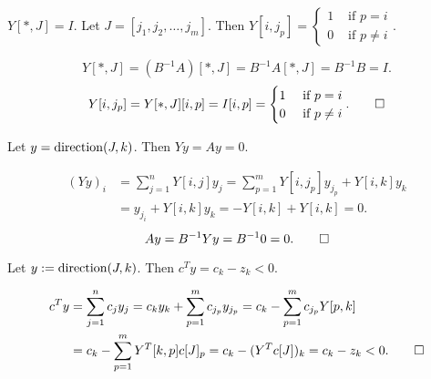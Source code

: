 \begin{lemma}
\label{thm:YJ-is-I}
$Y[*, J] = I$.
Let $J = [j_1, j_2, \ldots, j_m]$.
Then $Y[i, j_p] = \begin{cases}1 & \textrm{ if } p = i
\\ 0 & \textrm{ if } p \neq i\end{cases}$.
\end{lemma}
\begin{longProof}
\[ Y[*, J] = (B^{-1}A)[*, J] = B^{-1}A[*, J] = B^{-1}B = I. \]
\[ Y[i, j_p] = Y[*, J][i, p] = I[i, p] = \begin{cases}1 & \textrm{ if } p = i
\\ 0 & \textrm{ if } p \neq i\end{cases}. \qedhere \]
\end{longProof}

\begin{lemma}
\label{thm:y-in-nullsp}
Let $y = \operatorname{direction}(J, k)$. Then $Yy = Ay = 0$.
\end{lemma}
\begin{longProof}
\begin{align*}
(Yy)_i &= \sum_{j=1}^n Y[i, j]y_j
= \sum_{p=1}^m Y[i, j_p]y_{j_p} + Y[i, k]y_k
\\ &= y_{j_i} + Y[i, k]y_k
= -Y[i, k] + Y[i, k] = 0.
\end{align*}
\[ Ay = B^{-1}Yy = B^{-1}0 = 0. \qedhere \]
\end{longProof}

\begin{lemma}
\label{thm:y-reduces-cost}
Let $y := \operatorname{direction}(J, k)$. Then $c^Ty = c_k - z_k < 0$.
\end{lemma}
\begin{longProof}
\begin{align*}
c^Ty &= \sum_{j=1}^n c_jy_j = c_ky_k + \sum_{p=1}^m c_{j_p}y_{j_p}
= c_k - \sum_{p=1}^m c_{j_p}Y[p, k]
\\ &= c_k - \sum_{p=1}^m Y^T[k, p]c[J]_p
= c_k - (Y^Tc[J])_k = c_k - z_k < 0.
\qedhere \end{align*}
\end{longProof}

